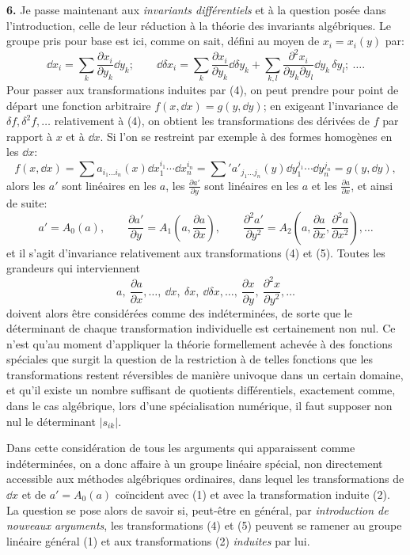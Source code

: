 \textbf{6.} Je passe maintenant aux \emph{invariants différentiels} et à la question posée dans l'introduction, celle de leur réduction à la théorie des invariants algébriques. Le groupe pris pour base est ici, comme on sait, défini au moyen de $x_i=x_i(y)$ par:
\[
\tag{4}
\dd x_i=\sum_k \frac{\partial x_i}{\partial y_k}\dd y_k;\qquad
\dd\delta x_i=\sum_k \frac{\partial x_i}{\partial y_k}\dd\delta y_k+
\sum_{k,l}\frac{\partial^2 x_i}{\partial y_k\partial y_l}\dd y_k\,\delta y_l;\ \ldots .
\]
Pour passer aux transformations induites par (4), on peut prendre pour point de départ une fonction arbitraire $f(x,\dd x)=g(y,\dd y)$; en exigeant l'invariance de $\delta f,\delta^2f,\ldots$ relativement à (4), on obtient les transformations des dérivées de $f$ par rapport à $x$ et à $\dd x$. Si l'on se restreint par exemple à des formes homogènes en les $\dd x$:
\[
 f(x,\dd x)=\sum a_{i_1\ldots i_n}(x)\dd x_1^{i_1}\cdots\dd x_n^{i_n}
 =\sum{}' a'_{j_1\ldots j_n}(y)\dd y_1^{j_1}\cdots\dd y_n^{j_n}
 =g(y,\dd y),
\]
alors les $a'$ sont linéaires en les $a$, les $\frac{\partial a'}{\partial y}$ sont linéaires en les $a$ et les $\frac{\partial a}{\partial x}$, et ainsi de suite:
\[
\tag{5}
a'=A_0(a),\qquad
\frac{\partial a'}{\partial y}=A_1\!\left(a,\frac{\partial a}{\partial x}\right),\qquad
\frac{\partial^2 a'}{\partial y^2}=A_2\!\left(a,\frac{\partial a}{\partial x},\frac{\partial^2 a}{\partial x^2}\right),\ldots
\]
et il s'agit d'invariance relativement aux transformations (4) et (5). Toutes les grandeurs qui interviennent
\[
a,\ \frac{\partial a}{\partial x},\ldots,\ \dd x,\ \delta x,\ \dd\delta x,\ldots,\ 
\frac{\partial x}{\partial y},\ \frac{\partial^2 x}{\partial y^2},\ldots
\]
doivent alors être considérées comme des indéterminées, de sorte que le déterminant de chaque transformation individuelle est certainement non nul. Ce n'est qu'au moment d'appliquer la théorie formellement achevée à des fonctions spéciales que surgit la question de la restriction à de telles fonctions que les transformations restent réversibles de manière univoque dans un certain domaine, et qu'il existe un nombre suffisant de quotients différentiels, exactement comme, dans le cas algébrique, lors d'une spécialisation numérique, il faut supposer non nul le déterminant $|s_{ik}|$.

Dans cette considération de tous les arguments qui apparaissent comme indéterminées, on a donc affaire à un groupe linéaire spécial, non directement accessible aux méthodes algébriques ordinaires, dans lequel les transformations de $\dd x$ et de $a'=A_0(a)$ coïncident avec (1) et avec la transformation induite (2). La question se pose alors de savoir si, peut-être en général, par \emph{introduction de nouveaux arguments}, les transformations (4) et (5) peuvent se ramener au groupe linéaire général (1) et aux transformations (2) \emph{induites} par lui.

